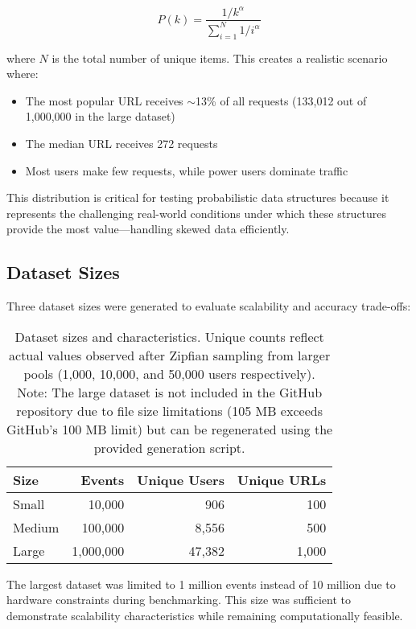 \begin{equation}
    P(k) = \frac{1/k^{\alpha}}{\sum_{i=1}^{N} 1/i^{\alpha}}
\end{equation}

where $N$ is the total number of unique items. This creates a realistic scenario where:

\begin{itemize}
    \item The most popular URL receives $\sim$13\% of all requests (133,012 out of 1,000,000 in the large dataset)
    \item The median URL receives 272 requests
    \item Most users make few requests, while power users dominate traffic
\end{itemize}

This distribution is critical for testing probabilistic data structures because it represents the challenging real-world conditions under which these structures provide the most value---handling skewed data efficiently.

\subsection{Dataset Sizes}

Three dataset sizes were generated to evaluate scalability and accuracy trade-offs:

\begin{table}[h]
\centering
\begin{tabular}{@{}lrrr@{}}
\toprule
\textbf{Size} & \textbf{Events} & \textbf{Unique Users} & \textbf{Unique URLs} \\
\midrule
Small  & 10,000     & 906       & 100  \\
Medium & 100,000    & 8,556     & 500  \\
Large  & 1,000,000  & 47,382    & 1,000 \\
\bottomrule
\end{tabular}
\caption{Dataset sizes and characteristics. Unique counts reflect actual values observed after Zipfian sampling from larger pools (1,000, 10,000, and 50,000 users respectively). Note: The large dataset is not included in the GitHub repository due to file size limitations (105 MB exceeds GitHub's 100 MB limit) but can be regenerated using the provided generation script.}
\label{tab:dataset_sizes}
\end{table}

The largest dataset was limited to 1 million events instead of 10 million due to hardware constraints during benchmarking. This size was sufficient to demonstrate scalability characteristics while remaining computationally feasible.

